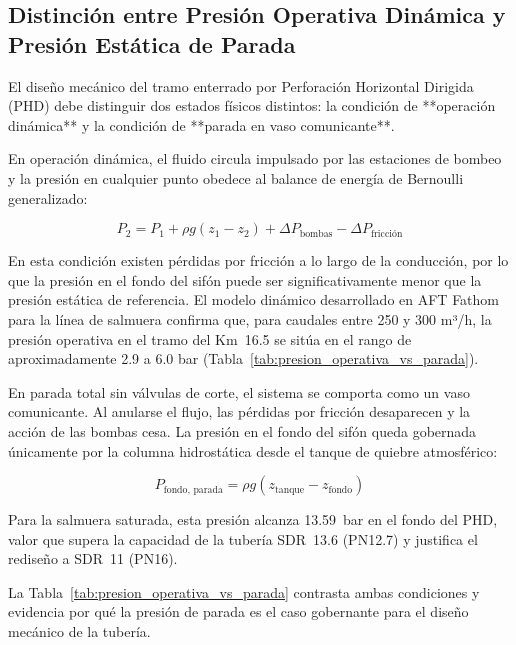 \subsection{Distinción entre Presión Operativa Dinámica y Presión Estática de Parada}
\label{ssec:analisis_dinamico_vs_estatico}

El diseño mecánico del tramo enterrado por Perforación Horizontal Dirigida (PHD) debe distinguir dos estados físicos distintos: la condición de **operación dinámica** y la condición de **parada en vaso comunicante**.

En operación dinámica, el fluido circula impulsado por las estaciones de bombeo y la presión en cualquier punto obedece al balance de energía de Bernoulli generalizado:

\begin{equation}
    P_2 = P_1 + \rho g (z_1 - z_2) + \Delta P_{\text{bombas}} - \Delta P_{\text{fricción}}
    \label{eq:bernoulli_generalizado}
\end{equation}

En esta condición existen pérdidas por fricción a lo largo de la conducción, por lo que la presión en el fondo del sifón puede ser significativamente menor que la presión estática de referencia. El modelo dinámico desarrollado en AFT Fathom para la línea de salmuera confirma que, para caudales entre 250 y 300 m³/h, la presión operativa en el tramo del Km~16.5 se sitúa en el rango de aproximadamente 2.9 a 6.0 bar (Tabla~\ref{tab:presion_operativa_vs_parada}).

En parada total sin válvulas de corte, el sistema se comporta como un vaso comunicante. Al anularse el flujo, las pérdidas por fricción desaparecen y la acción de las bombas cesa. La presión en el fondo del sifón queda gobernada únicamente por la columna hidrostática desde el tanque de quiebre atmosférico:

\begin{equation}
    P_{\text{fondo, parada}} = \rho g (z_{\text{tanque}} - z_{\text{fondo}})
    \label{eq:presion_parada}
\end{equation}

Para la salmuera saturada, esta presión alcanza \SI{13.59}{bar} en el fondo del PHD, valor que supera la capacidad de la tubería SDR~13.6 (PN12.7) y justifica el rediseño a SDR~11 (PN16).

La Tabla~\ref{tab:presion_operativa_vs_parada} contrasta ambas condiciones y evidencia por qué la presión de parada es el caso gobernante para el diseño mecánico de la tubería.

